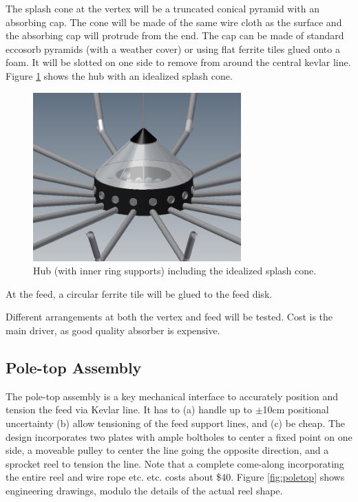 \documentclass[11pt]{article}
\begin{document}
The splash cone at the vertex will be a truncated conical pyramid with an absorbing cap.  The cone will be made of the same wire cloth as the surface and the absorbing cap will protrude from the end.  The cap can be made of standard eccosorb pyramids (with a weather cover) or using flat ferrite tiles glued onto a foam.  It will be slotted on one side to remove from around the central kevlar line.  Figure \ref{fig:hubwithsplash} shows the hub with an idealized splash cone.
\begin{figure}[H]
\centering
\includegraphics[width=8cm]{plots/hubwithsplash.png}
\caption{Hub (with inner ring supports) including the idealized splash cone.}
\label{fig:hubwithsplash}
\end{figure}

At the feed, a circular ferrite tile will be glued to the feed disk.

Different arrangements at both the vertex and feed will be tested.  Cost is the main driver, as good quality absorber is expensive.

\subsection{Pole-top Assembly}
The pole-top assembly is a key mechanical interface to accurately position and tension the feed via Kevlar line.  It has to (a) handle up to $\pm$10cm positional uncertainty (b) allow tensioning of the feed support lines, and (c) be cheap.  The design incorporates two plates with ample boltholes to center a fixed point on one side, a moveable pulley to center the line going the opposite direction, and a sprocket reel to tension the line.  Note that a complete come-along incorporating the entire reel and wire rope etc. etc. costs about \$40.  Figure \ref{fig:poletop} shows engineering drawings, modulo the details of the actual reel shape.
\end{document}
